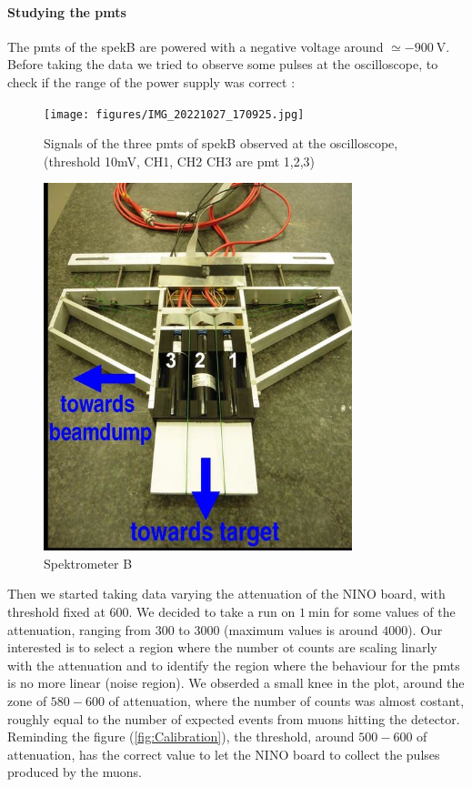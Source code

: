 \documentclass[10pt,a4paper]{article}
\begin{document}
\paragraph{Studying the pmts}
The pmts of the spekB are powered with a negative voltage around $\simeq \SI{-900}{\volt}$. Before taking the data we tried to observe some pulses at the oscilloscope, to check if the range of the power supply was correct :

\begin{figure}[hbtp]
\begin{minipage}[b]{0.45\textwidth}
\centering
\texttt{[image: figures/IMG\_20221027\_170925.jpg]}
\caption{Signals of the three pmts of spekB observed at the oscilloscope, (threshold 10mV, CH1, CH2 CH3 are pmt 1,2,3)}
\end{minipage}
\begin{minipage}[b]{0.45\textwidth}
\centering
\includegraphics[width = 0.8\textwidth]{figures/504px-Blackfalcon.jpg}
\caption{Spektrometer B }
\end{minipage}
\end{figure}

Then we started taking data varying the attenuation of the NINO board, with threshold fixed at 600. We decided to take a run on $\SI{1}{\minute}$ for some values of the attenuation, ranging from $300$ to $3000$ (maximum values is around $4000$). Our interested is to select a region where the number ot counts are scaling linarly with the attenuation and to identify the region where the behaviour for the pmts is no more linear (noise region). We obserded a small knee in the plot, around the zone of $580-600$ of attenuation, where the number of counts was almost costant, roughly equal to the number of expected events from muons hitting the detector. Reminding the figure (\ref{fig:Calibration}), the threshold, around $500-600$ of attenuation, has the correct value to let the NINO board to collect the pulses produced by the muons.
\end{document}

